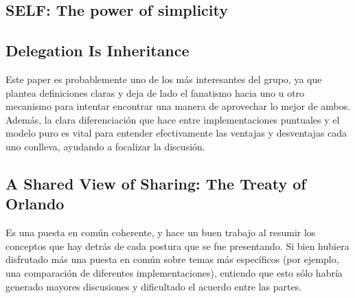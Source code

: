 \documentclass[a4paper,10pt]{article}
\begin{document}
\subsection{SELF: The power of simplicity}



\subsection{Delegation Is Inheritance}

Este paper es probablemente uno de los más interesantes del grupo, ya que plantea definiciones claras y deja de lado el fanatismo hacia uno u otro mecanismo para intentar encontrar una manera de aprovechar lo mejor de ambos. Además, la clara diferenciación que hace entre implementaciones puntuales y el modelo puro es vital para entender efectivamente las ventajas y desventajas cada uno conlleva, ayudando a focalizar la discusión.

\subsection{A Shared View of Sharing: The Treaty of Orlando}

Es una puesta en común coherente, y hace un buen trabajo al resumir los conceptos que hay detrás de cada postura que se fue presentando. Si bien hubiera disfrutado más una puesta en común sobre temas más específicos (por ejemplo, una comparación de diferentes implementaciones), entiendo que esto sólo habría generado mayores discusiones y dificultado el acuerdo entre las partes.


\printbibliography
\end{document}
